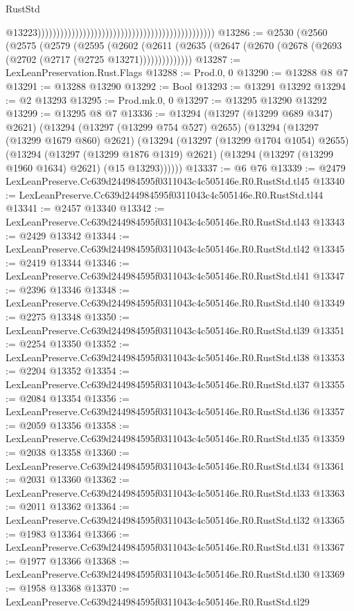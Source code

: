 \begin{lexlean}{RustStd}
\begin{coremodule}
                                                                                                  @13223)))))))))))))))))))))))))))))))))))))))))))))))
@13286 := @2530
    (@2560
      (@2575
        (@2579
          (@2595
            (@2602
              (@2611 (@2635 (@2647 (@2670 (@2678 (@2693 (@2702 (@2717 (@2725 @13271))))))))))))))
@13287 := LexLeanPreservation.Rust.Flags
@13288 := Prod.{0, 0}
@13290 := @13288 @8 @7
@13291 := @13288 @13290
@13292 := Bool
@13293 := @13291 @13292
@13294 := @2 @13293
@13295 := Prod.mk.{0, 0}
@13297 := @13295 @13290 @13292
@13299 := @13295 @8 @7
@13336 := @13294
    (@13297 (@13299 @689 @347) @2621)
    (@13294
      (@13297 (@13299 @754 @527) @2655)
      (@13294
        (@13297 (@13299 @1679 @860) @2621)
        (@13294
          (@13297 (@13299 @1704 @1054) @2655)
          (@13294
            (@13297 (@13299 @1876 @1319) @2621)
            (@13294 (@13297 (@13299 @1960 @1634) @2621) (@15 @13293))))))
@13337 := @6 @76
@13339 := @2479 LexLeanPreserve.Cc639d244984595f0311043c4c505146e.R0.RustStd.tl45
@13340 := LexLeanPreserve.Cc639d244984595f0311043c4c505146e.R0.RustStd.tl44
@13341 := @2457 @13340
@13342 := LexLeanPreserve.Cc639d244984595f0311043c4c505146e.R0.RustStd.tl43
@13343 := @2429 @13342
@13344 := LexLeanPreserve.Cc639d244984595f0311043c4c505146e.R0.RustStd.tl42
@13345 := @2419 @13344
@13346 := LexLeanPreserve.Cc639d244984595f0311043c4c505146e.R0.RustStd.tl41
@13347 := @2396 @13346
@13348 := LexLeanPreserve.Cc639d244984595f0311043c4c505146e.R0.RustStd.tl40
@13349 := @2275 @13348
@13350 := LexLeanPreserve.Cc639d244984595f0311043c4c505146e.R0.RustStd.tl39
@13351 := @2254 @13350
@13352 := LexLeanPreserve.Cc639d244984595f0311043c4c505146e.R0.RustStd.tl38
@13353 := @2204 @13352
@13354 := LexLeanPreserve.Cc639d244984595f0311043c4c505146e.R0.RustStd.tl37
@13355 := @2084 @13354
@13356 := LexLeanPreserve.Cc639d244984595f0311043c4c505146e.R0.RustStd.tl36
@13357 := @2059 @13356
@13358 := LexLeanPreserve.Cc639d244984595f0311043c4c505146e.R0.RustStd.tl35
@13359 := @2038 @13358
@13360 := LexLeanPreserve.Cc639d244984595f0311043c4c505146e.R0.RustStd.tl34
@13361 := @2031 @13360
@13362 := LexLeanPreserve.Cc639d244984595f0311043c4c505146e.R0.RustStd.tl33
@13363 := @2011 @13362
@13364 := LexLeanPreserve.Cc639d244984595f0311043c4c505146e.R0.RustStd.tl32
@13365 := @1983 @13364
@13366 := LexLeanPreserve.Cc639d244984595f0311043c4c505146e.R0.RustStd.tl31
@13367 := @1977 @13366
@13368 := LexLeanPreserve.Cc639d244984595f0311043c4c505146e.R0.RustStd.tl30
@13369 := @1958 @13368
@13370 := LexLeanPreserve.Cc639d244984595f0311043c4c505146e.R0.RustStd.tl29

\end{coremodule}
\end{lexlean}
